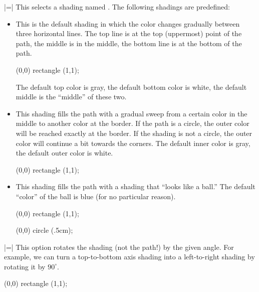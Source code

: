 \begin{itemize}
  |=|
  This selects a shading named . The following shadings are
  predefined:
  \begin{itemize}
  \item {}
    This is the default shading in which the color changes gradually
    between three horizontal lines. The top line is at the top
    (uppermost) point of the path, the middle is in the middle, the
    bottom line is at the bottom of the path.

\begin{codeexample}[]
\tikz \shadedraw [shading=axis] (0,0) rectangle (1,1);
\end{codeexample}

    The default top color is gray, the default bottom color is white,
    the default middle is the ``middle'' of these two.
  \item {}
    This shading fills the path with a gradual sweep from a certain
    color in the middle to another color at the border. If the path is
    a circle, the outer color will be reached exactly at the
    border. If the shading is not a circle, the outer color will
    continue a bit towards the corners. The default inner color is
    gray, the default outer color is white.

\begin{codeexample}[]
\tikz \shadedraw [shading=radial] (0,0) rectangle (1,1);
\end{codeexample}
  \item {}
    This shading fills the path with a shading that ``looks like a
    ball.'' The default ``color'' of the ball is blue (for no
    particular reason).

\begin{codeexample}[]
\tikz \shadedraw [shading=ball] (0,0) rectangle (1,1);
\end{codeexample}

\begin{codeexample}[]
\tikz \shadedraw [shading=ball] (0,0) circle (.5cm);
\end{codeexample}
  \end{itemize}
  |=|
  This option rotates the shading (not the path!) by the given
  angle. For example, we can turn a top-to-bottom axis shading into a
  left-to-right shading by rotating it by $90^\circ$.

\begin{codeexample}[]
\tikz \shadedraw [shading=axis,shading angle=90] (0,0) rectangle (1,1);
\end{codeexample}
\end{itemize}



